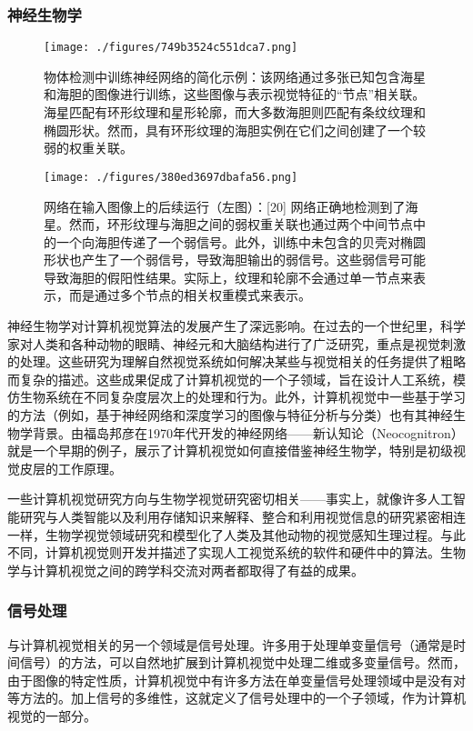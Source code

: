 \subsubsection{神经生物学}
\begin{figure}[ht]
\centering
\texttt{[image: ./figures/749b3524c551dca7.png]}
\caption{物体检测中训练神经网络的简化示例：该网络通过多张已知包含海星和海胆的图像进行训练，这些图像与表示视觉特征的“节点”相关联。海星匹配有环形纹理和星形轮廓，而大多数海胆则匹配有条纹纹理和椭圆形状。然而，具有环形纹理的海胆实例在它们之间创建了一个较弱的权重关联。} \label{fig_JSJ_2}
\end{figure}
\begin{figure}[ht]
\centering
\texttt{[image: ./figures/380ed3697dbafa56.png]}
\caption{网络在输入图像上的后续运行（左图）：[20] 网络正确地检测到了海星。然而，环形纹理与海胆之间的弱权重关联也通过两个中间节点中的一个向海胆传递了一个弱信号。此外，训练中未包含的贝壳对椭圆形状也产生了一个弱信号，导致海胆输出的弱信号。这些弱信号可能导致海胆的假阳性结果。实际上，纹理和轮廓不会通过单一节点来表示，而是通过多个节点的相关权重模式来表示。} \label{fig_JSJ_3}
\end{figure}
神经生物学对计算机视觉算法的发展产生了深远影响。在过去的一个世纪里，科学家对人类和各种动物的眼睛、神经元和大脑结构进行了广泛研究，重点是视觉刺激的处理。这些研究为理解自然视觉系统如何解决某些与视觉相关的任务提供了粗略而复杂的描述。这些成果促成了计算机视觉的一个子领域，旨在设计人工系统，模仿生物系统在不同复杂度层次上的处理和行为。此外，计算机视觉中一些基于学习的方法（例如，基于神经网络和深度学习的图像与特征分析与分类）也有其神经生物学背景。由福岛邦彦在1970年代开发的神经网络——新认知论（Neocognitron）就是一个早期的例子，展示了计算机视觉如何直接借鉴神经生物学，特别是初级视觉皮层的工作原理。

一些计算机视觉研究方向与生物学视觉研究密切相关——事实上，就像许多人工智能研究与人类智能以及利用存储知识来解释、整合和利用视觉信息的研究紧密相连一样，生物学视觉领域研究和模型化了人类及其他动物的视觉感知生理过程。与此不同，计算机视觉则开发并描述了实现人工视觉系统的软件和硬件中的算法。生物学与计算机视觉之间的跨学科交流对两者都取得了有益的成果。
\subsubsection{信号处理}  
与计算机视觉相关的另一个领域是信号处理。许多用于处理单变量信号（通常是时间信号）的方法，可以自然地扩展到计算机视觉中处理二维或多变量信号。然而，由于图像的特定性质，计算机视觉中有许多方法在单变量信号处理领域中是没有对等方法的。加上信号的多维性，这就定义了信号处理中的一个子领域，作为计算机视觉的一部分。
